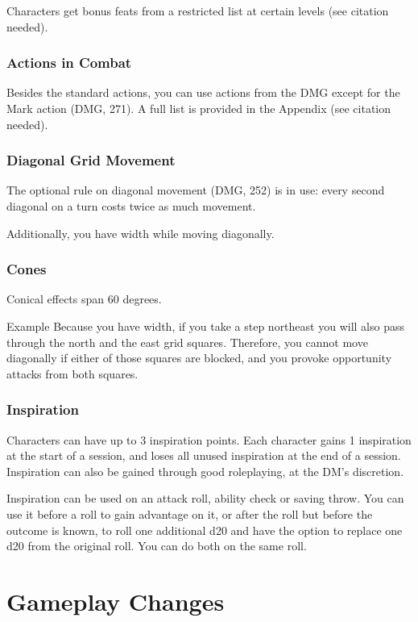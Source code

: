 \documentclass[letterpaper,twocolumn,openany,nodeprecatedcode]{dndbook}
\begin{document}
Characters get bonus feats from a restricted list at certain levels (see citation needed).

\subsection{Actions in Combat}
Besides the standard actions, you can use actions from the DMG except for the Mark action (DMG, 271). A full list is provided in the Appendix (see citation needed).

\subsection{Diagonal Grid Movement}
The optional rule on diagonal movement (DMG, 252) is in use: every second diagonal on a turn costs twice as much movement.

Additionally, you have width while moving diagonally. 

\subsection{Cones}
Conical effects span 60 degrees.

\begin{DndComment}{Example}
Because you have width, if you take a step northeast you will also pass through the north and the east grid squares. Therefore, you cannot move diagonally if either of those squares are blocked, and you provoke opportunity attacks from both squares.
\end{DndComment}

\subsection{Inspiration}
Characters can have up to 3 inspiration points. Each character gains 1 inspiration at the start of a session, and loses all unused inspiration at the end of a session. Inspiration can also be gained through good roleplaying, at the DM's discretion.

Inspiration can be used on an attack roll, ability check or saving throw. You can use it before a roll to gain advantage on it, or after the roll but before the outcome is known, to roll one additional d20 and have the option to replace one d20 from the original roll. You can do both on the same roll.






\chapter{Gameplay Changes}
\end{document}
